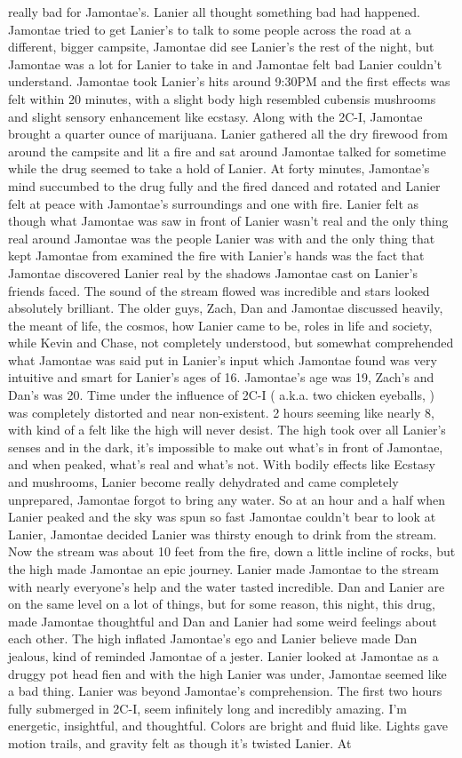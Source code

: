 \documentclass[12pt]{book}
\begin{document}
really bad for Jamontae's. Lanier all thought something bad had happened. Jamontae tried to get Lanier's to talk to some people across the road at a different, bigger campsite, Jamontae did see Lanier's the rest of the night, but Jamontae was a lot for Lanier to take in and Jamontae felt bad Lanier couldn't understand. Jamontae took Lanier's hits around 9:30PM and the first effects was felt within 20 minutes, with a slight body high resembled cubensis mushrooms and slight sensory enhancement like ecstasy. Along with the 2C-I, Jamontae brought a quarter ounce of marijuana. Lanier gathered all the dry firewood from around the campsite and lit a fire and sat around Jamontae talked for sometime while the drug seemed to take a hold of Lanier. At forty minutes, Jamontae's mind succumbed to the drug fully and the fired danced and rotated and Lanier felt at peace with Jamontae's surroundings and one with fire. Lanier felt as though what Jamontae was saw in front of Lanier wasn't real and the only thing real around Jamontae was the people Lanier was with and the only thing that kept Jamontae from examined the fire with Lanier's hands was the fact that Jamontae discovered Lanier real by the shadows Jamontae cast on Lanier's friends faced. The sound of the stream flowed was incredible and stars looked absolutely brilliant. The older guys, Zach, Dan and Jamontae discussed heavily, the meant of life, the cosmos, how Lanier came to be, roles in life and society, while Kevin and Chase, not completely understood, but somewhat comprehended what Jamontae was said put in Lanier's input which Jamontae found was very intuitive and smart for Lanier's ages of 16. Jamontae's age was 19, Zach's and Dan's was 20. Time under the influence of 2C-I ( a.k.a. two chicken eyeballs, ) was completely distorted and near non-existent. 2 hours seeming like nearly 8, with kind of a felt like the high will never desist. The high took over all Lanier's senses and in the dark, it's impossible to make out what's in front of Jamontae, and when peaked, what's real and what's not. With bodily effects like Ecstasy and mushrooms, Lanier become really dehydrated and came completely unprepared, Jamontae forgot to bring any water. So at an hour and a half when Lanier peaked and the sky was spun so fast Jamontae couldn't bear to look at Lanier, Jamontae decided Lanier was thirsty enough to drink from the stream. Now the stream was about 10 feet from the fire, down a little incline of rocks, but the high made Jamontae an epic journey. Lanier made Jamontae to the stream with nearly everyone's help and the water tasted incredible. Dan and Lanier are on the same level on a lot of things, but for some reason, this night, this drug, made Jamontae thoughtful and Dan and Lanier had some weird feelings about each other. The high inflated Jamontae's ego and Lanier believe made Dan jealous, kind of reminded Jamontae of a jester. Lanier looked at Jamontae as a druggy pot head fien and with the high Lanier was under, Jamontae seemed like a bad thing. Lanier was beyond Jamontae's comprehension. The first two hours fully submerged in 2C-I, seem infinitely long and incredibly amazing. I'm energetic, insightful, and thoughtful. Colors are bright and fluid like. Lights gave motion trails, and gravity felt as though it's twisted Lanier. At 
\end{document}
